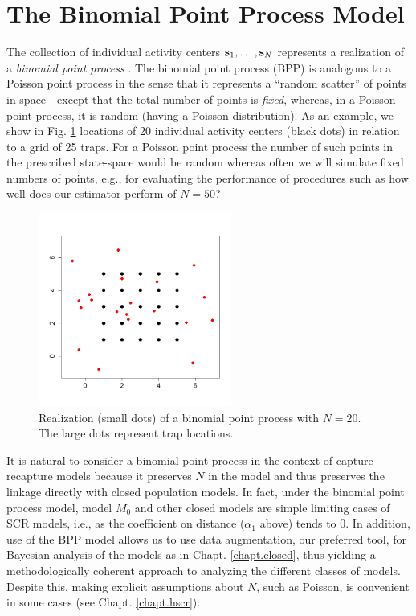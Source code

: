 \section{ The Binomial Point Process Model}
\label{scr0.sec.bpp}

The collection of individual activity centers ${\bf s}_{1},\ldots,
{\bf s}_{N}$ represents a realization of a {\it binomial point process}
\citep[][p. 61]{illian_etal:2008}.  The binomial point process (BPP)
is analogous to a Poisson point process in the sense that it
represents a ``random scatter'' of points in space - except that the
total number of points is {\it fixed}, whereas, in a Poisson point
process, it is random (having a Poisson distribution).  As an example,
we show in Fig. \ref{scr0.fig.bpp} locations of 20 individual activity
centers (black dots) in relation to a grid of 25 traps. For a Poisson
point process the number of such points in the prescribed state-space
would be random whereas often we will simulate fixed numbers of
points, e.g., for evaluating the performance of procedures such as how
well does our estimator perform of $N=50$?
\begin{figure}[ht]
\begin{center}
\includegraphics[height=2.5in]{Ch4-SCR0/figs/binomialpoint}
\end{center}
\caption{Realization (small dots) of a binomial point process with $N=20$. The
  large dots represent trap locations.
}
\label{scr0.fig.bpp}
\end{figure}

It is natural to consider a binomial point process in the context of
capture-recapture models because it preserves $N$ in the model and thus
preserves the linkage directly with closed population models. In fact,
under the binomial point process model, model $M_0$ and other closed
models are simple limiting cases of SCR models, i.e., as the
coefficient on distance ($\alpha_1$ above) tends to 0.
In addition, use of
the BPP model allows us to use data augmentation, our preferred tool,  for Bayesian analysis
of the models as in Chapt. \ref{chapt.closed}, thus yielding a methodologically
coherent approach to analyzing the different classes of
models. Despite this, making explicit assumptions about $N$, such as
Poisson, is convenient in some cases (see Chapt. \ref{chapt.hscr}).

